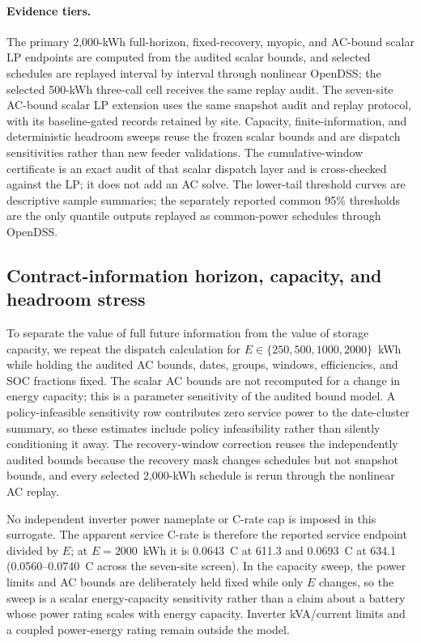 \documentclass[11pt]{article}
\begin{document}
\paragraph{Evidence tiers.} The primary 2,000-kWh full-horizon, fixed-recovery, myopic, and AC-bound scalar LP endpoints are computed from the audited scalar bounds, and selected schedules are replayed interval by interval through nonlinear OpenDSS; the selected 500-kWh three-call cell receives the same replay audit. The seven-site AC-bound scalar LP extension uses the same snapshot audit and replay protocol, with its baseline-gated records retained by site. Capacity, finite-information, and deterministic headroom sweeps reuse the frozen scalar bounds and are dispatch sensitivities rather than new feeder validations. The cumulative-window certificate is an exact audit of that scalar dispatch layer and is cross-checked against the LP; it does not add an AC solve. The lower-tail threshold curves are descriptive sample summaries; the separately reported common 95\% thresholds are the only quantile outputs replayed as common-power schedules through OpenDSS.

\subsection{Contract-information horizon, capacity, and headroom stress}
To separate the value of full future information from the value of storage capacity, we repeat the dispatch calculation for $E\in\{250,500,1000,2000\}$~kWh while holding the audited AC bounds, dates, groups, windows, efficiencies, and SOC fractions fixed. The scalar AC bounds are not recomputed for a change in energy capacity; this is a parameter sensitivity of the audited bound model. A policy-infeasible sensitivity row contributes zero service power to the date-cluster summary, so these estimates include policy infeasibility rather than silently conditioning it away. The recovery-window correction reuses the independently audited bounds because the recovery mask changes schedules but not snapshot bounds, and every selected 2,000-kWh schedule is rerun through the nonlinear AC replay.

No independent inverter power nameplate or C-rate cap is imposed in this surrogate. The apparent service C-rate is therefore the reported service endpoint divided by $E$; at $E=2000$~kWh it is 0.0643~C at 611.3 and 0.0693~C at 634.1 (0.0560--0.0740~C across the seven-site screen). In the capacity sweep, the power limits and AC bounds are deliberately held fixed while only $E$ changes, so the sweep is a scalar energy-capacity sensitivity rather than a claim about a battery whose power rating scales with energy capacity. Inverter kVA/current limits and a coupled power-energy rating remain outside the model.
\end{document}
